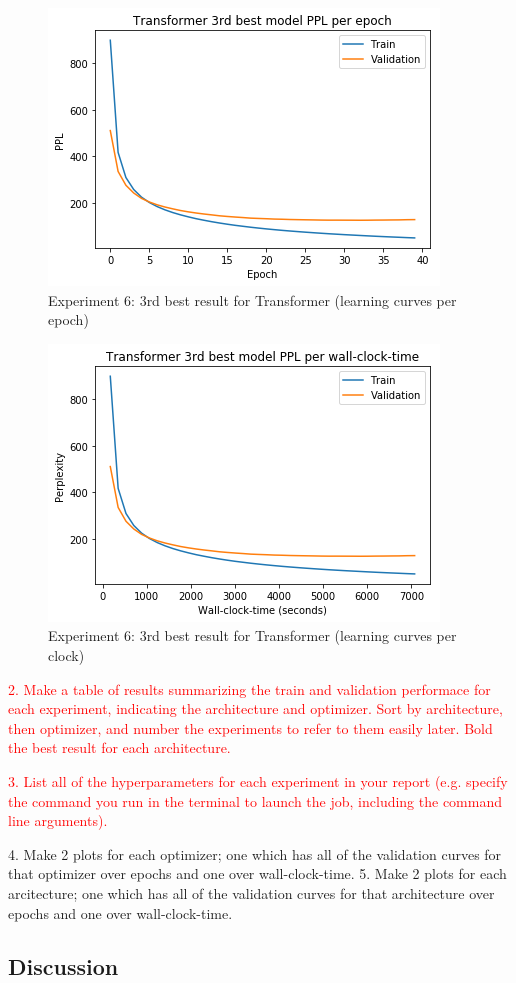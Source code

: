 \begin{itemize}
\begin{figure}[H]
	\centering
	\includegraphics[scale=0.8]{Q4-3_TR_3epoch.png}
	\caption{Experiment 6: 3rd best result for Transformer (learning curves per epoch)}
	\label{fig:fig22TR}
\end{figure}
\begin{figure}[H]
	\centering
	\includegraphics[scale=0.8]{Q4-3_TR_3time.png}
	\caption{Experiment 6: 3rd best result for Transformer (learning curves per clock)}
	\label{fig:fig22bTR}
\end{figure}

\end{itemize}




\textcolor{red}{2. Make a table of results summarizing the train and validation performace for each experiment,
	indicating the architecture and optimizer. Sort by architecture, then optimizer, and number
	the experiments to refer to them easily later. Bold the best result for each architecture.}

\textcolor{red}{3. List all of the hyperparameters for each experiment in your report (e.g. specify the command
you run in the terminal to launch the job, including the command line arguments).}

4. Make 2 plots for each optimizer; one which has all of the validation curves for that optimizer
over epochs and one over wall-clock-time.
5. Make 2 plots for each arcitecture; one which has all of the validation curves for that architecture
over epochs and one over wall-clock-time.
\subsection{Discussion}
